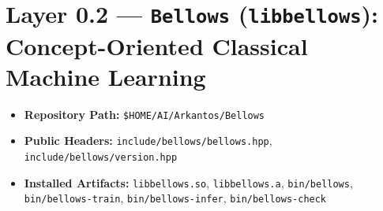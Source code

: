 \documentclass[11pt,a4paper]{article}
\begin{document}
\section{Layer 0.2 --- \texttt{Bellows} (\texttt{libbellows}): Concept-Oriented Classical Machine Learning}

\begin{itemize}[leftmargin=1.5em,itemsep=1pt]
  \item \textbf{Repository Path:} \texttt{\$HOME/AI/Arkantos/Bellows}
  \item \textbf{Public Headers:} \texttt{include/bellows/bellows.hpp}, \texttt{include/bellows/version.hpp}
  \item \textbf{Installed Artifacts:} \texttt{libbellows.so}, \texttt{libbellows.a}, \texttt{bin/bellows}, \texttt{bin/bellows-train}, \texttt{bin/bellows-infer}, \texttt{bin/bellows-check}
\end{itemize}
\end{document}
